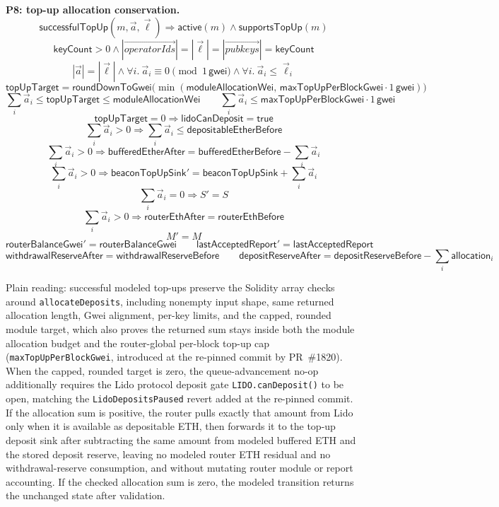 \medskip
\noindent\textbf{P8: top-up allocation conservation.}
\[
  \mathsf{successfulTopUp}(m,\vec{a},\vec{\ell})
  \Rightarrow
  \mathsf{active}(m)
  \land \mathsf{supportsTopUp}(m)
\]
\[
  \mathsf{keyCount}>0
  \land
  |\vec{operatorIds}|=|\vec{\ell}|=|\vec{pubkeys}|=\mathsf{keyCount}
\]
\[
  |\vec{a}| = |\vec{\ell}|
  \land
  \forall i.\ \vec{a}_i \equiv 0 \pmod{1\,\mathsf{gwei}}
  \land
  \forall i.\ \vec{a}_i \leq \vec{\ell}_i
\]
\[
  \mathsf{topUpTarget}
  =
  \mathsf{roundDownToGwei}\bigl(
    \min(\mathsf{moduleAllocationWei},\,
         \mathsf{maxTopUpPerBlockGwei}\cdot 1\,\mathsf{gwei})\bigr)
\]
\[
  \sum_i \vec{a}_i
  \leq
  \mathsf{topUpTarget}
  \leq
  \mathsf{moduleAllocationWei}
  \qquad
  \sum_i \vec{a}_i
  \leq
  \mathsf{maxTopUpPerBlockGwei}\cdot 1\,\mathsf{gwei}
\]
\[
  \mathsf{topUpTarget} = 0
  \Rightarrow
  \mathsf{lidoCanDeposit} = \mathsf{true}
\]
\[
  \sum_i \vec{a}_i > 0
  \Rightarrow
  \sum_i \vec{a}_i \leq \mathsf{depositableEtherBefore}
\]
\[
  \sum_i \vec{a}_i > 0
  \Rightarrow
  \mathsf{bufferedEtherAfter}
    = \mathsf{bufferedEtherBefore} - \sum_i \vec{a}_i
\]
\[
  \sum_i \vec{a}_i > 0
  \Rightarrow
  \mathsf{beaconTopUpSink}' =
    \mathsf{beaconTopUpSink} + \sum_i \vec{a}_i
\]
\[
  \sum_i \vec{a}_i = 0
  \Rightarrow
  S' = S
\]
\[
  \sum_i \vec{a}_i > 0
  \Rightarrow
  \mathsf{routerEthAfter} = \mathsf{routerEthBefore}
\]
\[
  M' = M
\]
\[
  \mathsf{routerBalanceGwei}' = \mathsf{routerBalanceGwei}
  \qquad
  \mathsf{lastAcceptedReport}' = \mathsf{lastAcceptedReport}
\]
\[
  \mathsf{withdrawalReserveAfter} = \mathsf{withdrawalReserveBefore}
  \qquad
  \mathsf{depositReserveAfter}
    = \mathsf{depositReserveBefore} - \sum_i \mathsf{allocation}_i
\]

\noindent Plain reading: successful modeled top-ups preserve the Solidity
array checks around \texttt{allocateDeposits}, including nonempty input shape,
same returned allocation length, Gwei alignment, per-key limits, and the
capped, rounded module target, which also proves the returned sum stays inside
both the module allocation budget and the router-global per-block top-up cap
(\texttt{maxTopUpPerBlockGwei}, introduced at the re-pinned commit by
PR~\#1820). When the capped, rounded target is zero, the queue-advancement
no-op additionally requires the Lido protocol deposit gate
\texttt{LIDO.canDeposit()} to be open, matching the \texttt{LidoDepositsPaused}
revert added at the re-pinned commit. If the allocation sum is positive, the
router pulls exactly that amount from Lido only when it is available as
depositable ETH, then forwards it to the top-up deposit sink after subtracting
the same amount from modeled buffered ETH and the stored deposit reserve,
leaving no modeled router ETH residual and no withdrawal-reserve consumption,
and without mutating router module or report accounting.
If the checked allocation sum is zero, the modeled transition returns the
unchanged state after validation.


